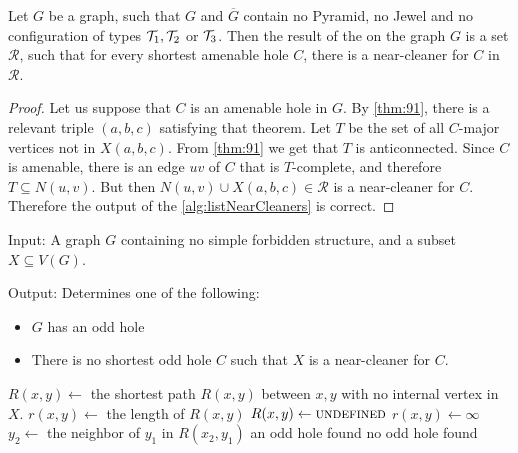 \begin{theorem}
	Let $G$ be a graph, such that $G$ and $\overline{G}$ contain no Pyramid, no Jewel and no configuration of types $\mathcal{T}_1, \mathcal{T}_2$ or $\mathcal{T}_3$. Then the result of the  on the graph $G$ is a set $\mathcal{R}$, such that for every shortest amenable hole $C$, there is a near-cleaner for $C$ in $\mathcal{R}$.
\end{theorem}
\begin{proof}
	Let us suppose that $C$ is an amenable hole in $G$. By \cref{thm:91}, there is a relevant triple $(a, b, c)$ satisfying that theorem. Let $T$ be the set of all $C$-major vertices not in $X(a,b,c)$. From \cref{thm:91} we get that $T$ is anticonnected. Since $C$ is amenable, there is an edge $uv$ of $C$ that is $T$-complete, and therefore $T \subseteq N(u, v)$. But then $N(u, v) \cup X(a, b, c) \in \mathcal{R}$ is a near-cleaner for $C$. Therefore the output of the \cref{alg:listNearCleaners} is correct.
\end{proof}

\begin{alg}
	\label{alg:testNearCleaner}
	Input: A graph $G$ containing no simple forbidden structure, and a subset $X \subseteq V(G)$.

	\noindent Output: Determines one of the following:
	\begin{itemize}
		\item $G$ has an odd hole
		\item There is no shortest odd hole $C$ such that $X$ is a near-cleaner for $C$.
	\end{itemize}
\end{alg}

\begin{algorithmic}[1]
				\ls $R(x, y) \gets$ the shortest path $R(x, y)$ between $x, y$ with no
				\lsx internal vertex in $X$.
				\ls $r(x, y) \gets$ the length of $R(x, y)$
			\mElse
				\ls $R(x, y) \gets \textsc{undefined}$
				\ls $r(x, y) \gets \infty$
			\mEndIf
						\ls $y_2 \gets$ the neighbor of $y_1$ in $R(x_2, y_1)$
						\ls \RETURN an odd hole found
						\mEndIf
					\mEndIf
				\mEndFor
			\mEndFor
		\mEndFor
		\RETURN no odd hole found
	\mEndProcedure
\end{algorithmic}



